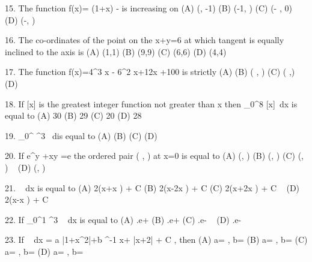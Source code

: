 15. The function f(x)= \log (1+x) -  is increasing on
(A) (\infty , -1) \qquad \qquad \qquad \qquad \qquad (B) (-1, \infty )
(C) (- \infty , 0) \qquad \qquad \qquad \qquad \qquad (D) (-\infty , \infty)

16. The co-ordinates of the point on the \sqrt x+\sqrt y=6 at which tangent is equally inclined to the axis is
(A) (1,1) \qquad \qquad \qquad \qquad \qquad (B) (9,9)
(C) (6,6) \qquad \qquad \qquad \qquad \qquad (D) (4,4)

17. The function f(x)=4\sin^3 x - 6\sin^2 x+12\sin x +100 is strictly
(A)   \qquad \qquad \qquad \qquad \qquad (B)  \left( \pi, \right)
(C)  \left( ,\pi \right) \qquad \qquad \qquad \qquad \quad ~ (D)  

18. If [x] is the greatest integer function not greater than x then \int_{0}^{8} [x]~dx is equal to
(A) 30 \qquad \qquad \qquad \qquad \qquad (B) 29
(C) 20 \qquad \qquad \qquad \qquad \qquad (D) 28

19. \int_{0}^{} \sqrt{\sin \theta} \cos^3\theta ~ d\theta is equal to
(A)  \qquad \qquad \qquad \qquad \qquad (B) 
(C)  \qquad \qquad \qquad \qquad \qquad (D) 

20. If e^y +xy =e the ordered pair \left( , \right) at x=0 is equal to
(A) \left(, \right) \qquad \qquad \qquad \qquad \qquad (B) \left(, \right)
(C) \left(, \right) \qquad \qquad \qquad \qquad \qquad ~ (D) \left(, \right)

21. \int {} ~ dx is equal to
(A) 2(\sin x+x \cos \alpha) + C \qquad \qquad \qquad \qquad \qquad (B) 2(\sin x-2x \cos \alpha) + C
(C) 2(\sin x+2x \cos \alpha) + C \qquad \qquad \qquad \qquad \quad ~ (D) 2(\sin x-x \cos \alpha) + C

22. If \int_{0}^{1} ^3 ~ dx is equal to
(A) .e+  \qquad \qquad \qquad \qquad \qquad (B) .e+ 
(C) .e-  \qquad \qquad \qquad \qquad \qquad ~ (D) .e- 

23. If \int {} ~ dx = a \log |1+x^2|+b \tan^{-1} x+  \log |x+2| + C , then
(A) a= , b= \qquad \qquad \qquad \qquad \qquad (B) a= , b=
(C) a= , b= \qquad \qquad \qquad \qquad \qquad (D) a= , b=

